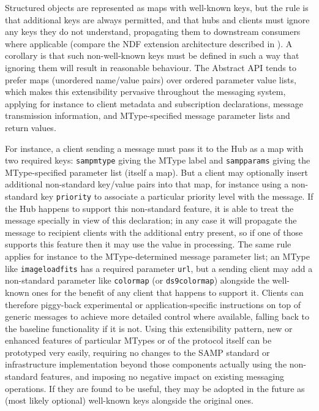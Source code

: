 \documentclass[5p]{elsarticle}
\begin{document}
Structured objects are represented as maps with well-known keys,
but the rule is that additional keys are always permitted,
and that hubs and clients must ignore any keys they do not understand,
propagating them to downstream consumers where applicable
(compare the NDF extension architecture described in \citet{sgp38}).
A corollary is that such non-well-known keys must be defined in such
a way that ignoring them will result in reasonable behaviour.
The Abstract API tends to prefer maps (unordered name/value pairs)
over ordered parameter value lists, which makes this extensibility
pervasive throughout the messaging system,
applying for instance to
client metadata and subscription declarations,
message transmission information,
and MType-specified message parameter lists and return values.

For instance, a client sending a message must pass it to the Hub
as a map with two required keys:
{\tt samp{\kdot}mtype} giving the MType label and
{\tt samp{\kdot}params} giving the MType-specified parameter list
(itself a map).
But a client may optionally insert additional non-standard key/value pairs
into that map, for instance using a non-standard key {\tt priority}
to associate a particular priority level with the message.
If the Hub happens to support this non-standard feature,
it is able to treat the message specially in view of this declaration;
in any case it will propagate the message to recipient clients
with the additional entry present, so if one of those supports
this feature then it may use the value in processing.
The same rule applies for instance to the MType-determined
message parameter list;
an MType like {\tt image{\kdot}load{\kdot}fits}
has a required parameter {\tt url},
but a sending client may add a non-standard parameter like
{\tt colormap} (or {\tt ds9{\kdot}colormap}) alongside the well-known ones
for the benefit of any client that happens to support it.
Clients can therefore piggy-back experimental or application-specific
instructions on top of generic messages to achieve more detailed control
where available, falling back to the baseline functionality if it is not.
Using this extensibility pattern, new or enhanced features of 
particular MTypes or of the protocol itself can be prototyped 
very easily, requiring no changes to the SAMP standard or infrastructure
implementation beyond those components actually using
the non-standard features,
and imposing no negative impact on existing messaging operations.
If they are found to be useful, they may be adopted in the future
as (most likely optional) well-known keys alongside the original ones.
\end{document}
